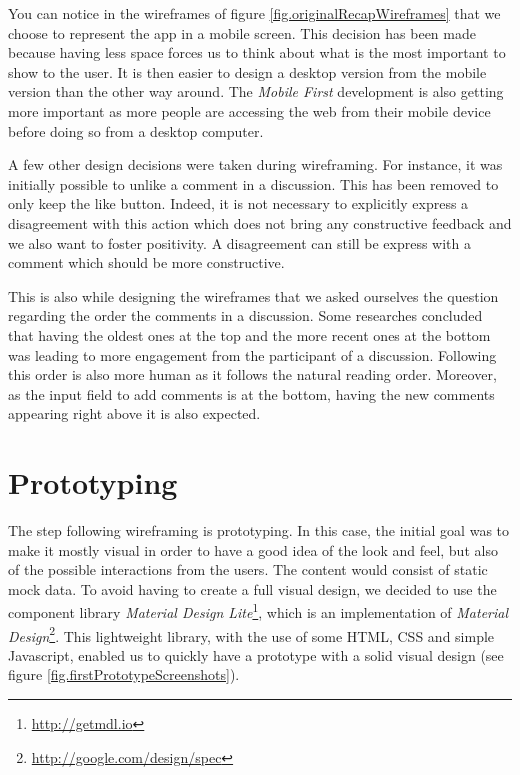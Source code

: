 \documentclass[a4paper,12pt, oneside]{article}
\begin{document}
You can notice in the wireframes of figure \ref{fig.originalRecapWireframes} that we choose to represent the app in a mobile screen.
This decision has been made because having less space forces us to think about what is the most important to show to the user.
It is then easier to design a desktop version from the mobile version than the other way around.
The \emph{Mobile First} development is also getting more important as more people are accessing the web from their mobile device before doing so from a desktop computer.

A few other design decisions were taken during wireframing.
For instance, it was initially possible to unlike a comment in a discussion.
This has been removed to only keep the like button.
Indeed, it is not necessary to explicitly express a disagreement with this action which does not bring any constructive feedback and we also want to foster positivity.
A disagreement can still be express with a comment which should be more constructive.

This is also while designing the wireframes that we asked ourselves the question regarding the order the comments in a discussion.
Some researches \cite{mabande2010designing} concluded that having the oldest ones at the top and the more recent ones at the bottom was leading to more engagement from the participant of a discussion.
Following this order is also more human as it follows the natural reading order.
Moreover, as the input field to add comments is at the bottom, having the new comments appearing right above it is also expected.


\section{Prototyping}
The step following wireframing is prototyping.
In this case, the initial goal was to make it mostly visual in order to have a good idea of the look and feel, but also of the possible interactions from the users.
The content would consist of static mock data.
To avoid having to create a full visual design, we decided to use the component library \emph{Material Design Lite}\footnote{\url{http://getmdl.io}}, which is an implementation of \emph{Material Design}\footnote{\url{http://google.com/design/spec}}.
This lightweight library, with the use of some HTML, CSS and simple Javascript, enabled us to quickly have a prototype with a solid visual design (see figure \ref{fig.firstPrototypeScreenshots}).
\end{document}
